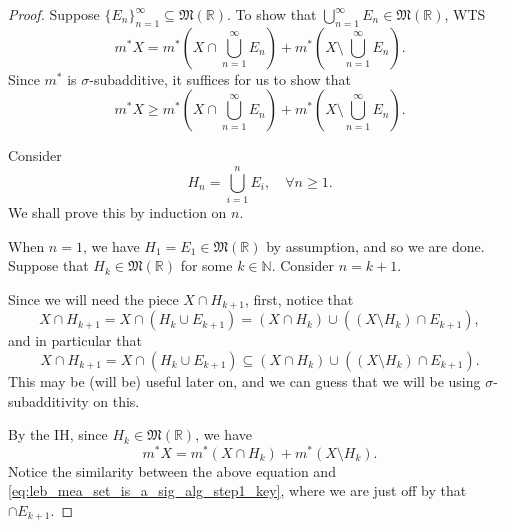 \documentclass[notoc,notitlepage]{tufte-book}
\begin{document}
\begin{proof}
   Suppose
  $\{ E_n \}_{n=1}^{\infty} \subseteq \mathfrak{M}(\mathbb{R})$. To show that
  $\bigcup_{n=1}^{\infty} E_n \in \mathfrak{M}(\mathbb{R})$, WTS
  \begin{equation*}
    m^* X = m^* \left( X \cap \bigcup_{n=1}^{\infty} E_n \right) + m^* \left( X
    \setminus \bigcup_{n=1}^{\infty} E_n \right).
  \end{equation*}
  Since $m^*$ is $\sigma$-subadditive, it suffices for us to show that
  \begin{equation}\label{eq:leb_mea_set_is_a_sig_alg_biggoal}
    m^* X \geq m^* \left( X \cap \bigcup_{n=1}^{\infty} E_n \right) + m^* \left(
    X \setminus \bigcup_{n=1}^{\infty} E_n \right).
  \end{equation}

  \noindent
   Consider
  \begin{equation*}
    H_n = \bigcup_{i=1}^{n} E_i, \quad \forall n \geq 1.
  \end{equation*}
   We
  shall prove this by induction on $n$.

  When $n = 1$, we have $H_1 = E_1 \in \mathfrak{M}(\mathbb{R})$ by assumption,
  and so we are done. Suppose that $H_k \in \mathfrak{M}(\mathbb{R})$ for some
  $k \in \mathbb{N}$. Consider $n = k + 1$.

  Since we will need the piece $X \cap H_{k+1}$, first, notice that
  \begin{equation*}
    X \cap H_{k + 1} = X \cap ( H_k \cup E_{k + 1} ) = (X \cap H_k) \cup ((X
    \setminus H_k) \cap E_{k + 1}),
  \end{equation*}
  and in particular that
  \begin{equation}\label{eq:leb_mea_set_is_a_sig_alg_step1_key}
    X \cap H_{k+1} = X \cap ( H_k \cup E_{k + 1} ) \subseteq (X \cap H_k) \cup
    ((X \setminus H_k) \cap E_{k + 1}).
  \end{equation}
  This may be (will be) useful later on, and we can guess that we will be using
  $\sigma$-subadditivity on this.

  By the IH, since $H_k \in \mathfrak{M}(\mathbb{R})$, we have
  \begin{equation*}
    m^* X = m^* ( X \cap H_k ) + m^* ( X \setminus H_k ).
  \end{equation*}
  Notice the similarity between the above equation and
  \cref{eq:leb_mea_set_is_a_sig_alg_step1_key}, where we are just off by that
  $\cap E_{k + 1}$.


\end{proof}
\end{document}
